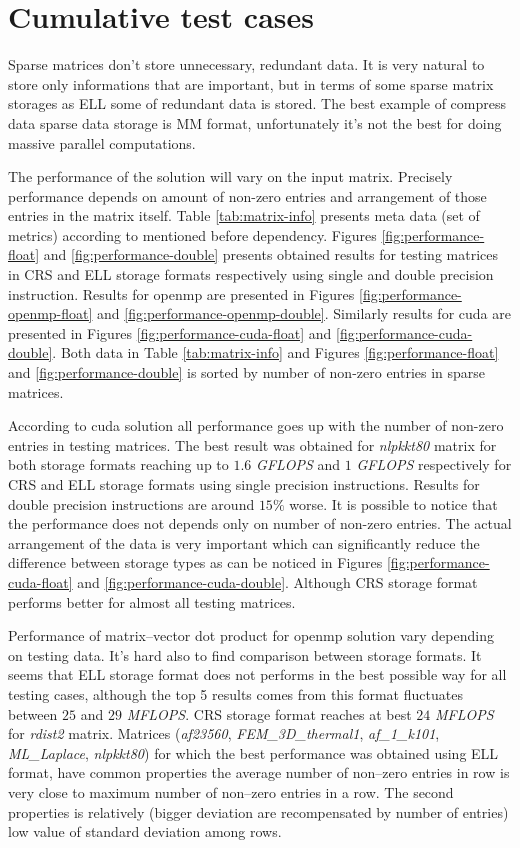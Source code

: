 \chapter{Cumulative test cases}
	Sparse matrices don't store unnecessary, redundant data. It is very natural to store only informations that are important, but in terms of some sparse matrix storages as \gls{ELL} some of redundant data is stored. The best example of compress data sparse data storage is \gls{MM} format, unfortunately it's not the best for doing massive parallel computations.
	
	The performance of the solution will vary on the input matrix. Precisely performance depends on amount of non-zero entries and arrangement of those entries in the matrix itself. Table \ref{tab:matrix-info} presents meta data (set of metrics) according to mentioned before dependency. Figures \ref{fig:performance-float} and \ref{fig:performance-double} presents obtained results for testing matrices in \gls{CRS} and \gls{ELL} storage formats respectively using single and double precision instruction. Results for \gls{openmp} are presented in Figures \ref{fig:performance-openmp-float} and \ref{fig:performance-openmp-double}. Similarly results for \gls{cuda} are presented in Figures \ref{fig:performance-cuda-float} and \ref{fig:performance-cuda-double}. Both data in Table \ref{tab:matrix-info} and Figures \ref{fig:performance-float} and \ref{fig:performance-double} is sorted by number of non-zero entries in sparse matrices.
	
	According to \gls{cuda} solution all performance goes up with the number of non-zero entries in testing matrices. The best result was obtained for \emph{nlpkkt80} matrix for both storage formats reaching up to $1.6$ \emph{G\gls{FLOPS}} and $1$ \emph{G\gls{FLOPS}} respectively for \gls{CRS} and \gls{ELL} storage formats using single precision instructions. Results for double precision instructions are around $15\%$ worse. It is possible to notice that the performance does not depends only on number of non-zero entries. The actual arrangement of the data is very important which can significantly reduce the difference between storage types as can be noticed in Figures \ref{fig:performance-cuda-float} and \ref{fig:performance-cuda-double}. Although \gls{CRS} storage format performs better for almost all testing matrices.
	
	Performance of matrix--vector dot product for \gls{openmp} solution vary depending on testing data. It's hard also to find comparison between storage formats. It seems that \gls{ELL} storage format does not performs in the best possible way for all testing cases, although the top 5 results comes from this format fluctuates between $25$ and $29$ \emph{M\gls{FLOPS}}. \gls{CRS} storage format reaches at best $24$ \emph{M\gls{FLOPS}} for \emph{rdist2} matrix. Matrices (\emph{af23560}, \emph{FEM\_3D\_thermal1}, \emph{af\_1\_k101}, \emph{ML\_Laplace}, \emph{nlpkkt80}) for which the best performance was obtained using \gls{ELL} format, have common properties the average number of non--zero entries in row is very close to maximum number of non--zero entries in a row. The second properties is relatively (bigger deviation are recompensated by number of entries) low value of standard deviation among rows.
	
